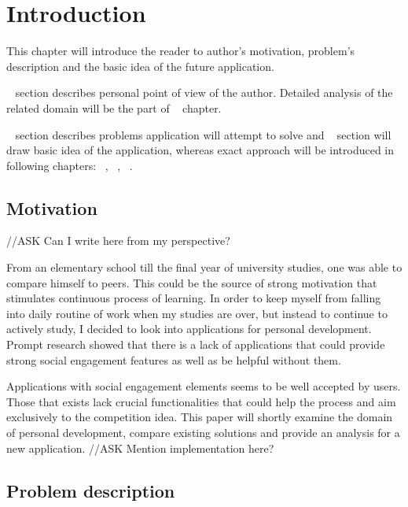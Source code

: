 
\chapter{Introduction}\label{ch:introduction}


This chapter will introduce the reader to author's motivation, problem's description and the basic idea of the future application.

~ section describes personal point of view of the author.
Detailed analysis of the related domain will be the part of ~ chapter.

~ section describes problems application will attempt to solve and
~ section will draw basic idea of the application, whereas exact approach
will be introduced in following chapters: ~, ~, ~.


\section{Motivation}\label{sec:introduction-motivation}

{\color{gray}//ASK Can I write here from my perspective?}

From an elementary school till the final year of university studies, one was able to compare himself to peers.
This could be the source of strong motivation that stimulates continuous process of learning.
In order to keep myself from falling into daily routine of work when my studies are over,
but instead to continue to actively study, I decided to look into applications for personal development.
Prompt research showed that there is a lack of applications that could provide strong social engagement features
as well as be helpful without them.

Applications with social engagement elements seems to be well accepted by users.
Those that exists lack crucial functionalities that could help the process and aim exclusively to the competition idea.
This paper will shortly examine the domain of personal development, compare existing solutions and provide an analysis for a
new application.
{\color{gray}//ASK Mention implementation here?}

\section{Problem description}\label{sec:problem-description}

